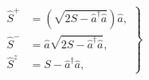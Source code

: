 \documentclass{article}
\begin{document}
  \begin{align*}
    \left . \begin{aligned}
      \hat{S}^{+} & = \left(\sqrt{2S-\hat{a}^{\dagger}\hat{a}}\right)\hat{a}, \\
      \hat{S}^{-} & = \hat{a}\sqrt{2S-\hat{a}^{\dagger}\hat{a}}, \\
      \hat{S}^{z} & =S-\hat{a}^{\dagger}\hat{a},
    \end{aligned} \right\rbrace
  \end{align*}
\end{document}
